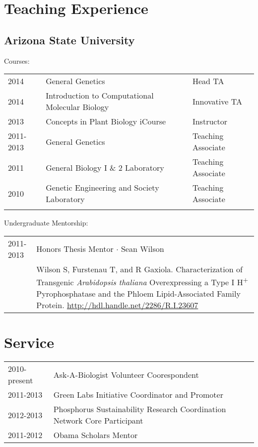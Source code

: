 \documentclass[11pt]{article}
\begin{document}
\section*{Teaching Experience}
\subsection*{Arizona State University}
Courses:\\
\begin{tabularx}{\linewidth}{llX}
2014&General Genetics& Head TA\\
2014& Introduction to Computational Molecular Biology& Innovative TA\\
2013&Concepts in Plant Biology iCourse& Instructor\\
2011-2013&General Genetics&Teaching Associate\\
2011&General Biology I \& 2 Laboratory& Teaching Associate\\
2010&Genetic Engineering and Society Laboratory&Teaching Associate\\\\
\end{tabularx}
Undergraduate Mentorship:\\
\begin{tabularx}{\linewidth}{lX}
2011-2013&Honors Thesis Mentor $\cdotp$ Sean Wilson\\
&Wilson S, Furstenau T, and R Gaxiola. Characterization of Transgenic \textit{Arabidopsis thaliana} Overexpressing a Type I H\textsuperscript{+} Pyrophosphatase and the Phloem Lipid-Associated Family Protein. \href{http://hdl.handle.net/2286/R.I.23607}{http://hdl.handle.net/2286/R.I.23607}\\
\end{tabularx}



\section*{Service}
\begin{tabularx}{\linewidth}{lX}
2010-present &Ask-A-Biologist Volunteer Coorespondent\\
2011-2013&Green Labs Initiative Coordinator and Promoter\\
2012-2013&Phosphorus Sustainability Research Coordination Network Core Participant\\
2011-2012&Obama Scholars Mentor\\
\end{tabularx}
\end{document}
